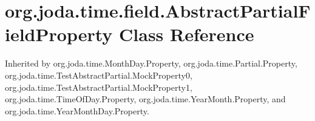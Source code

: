 \hypertarget{classorg_1_1joda_1_1time_1_1field_1_1_abstract_partial_field_property}{\section{org.\-joda.\-time.\-field.\-Abstract\-Partial\-Field\-Property Class Reference}
\label{classorg_1_1joda_1_1time_1_1field_1_1_abstract_partial_field_property}
}


Inherited by org.\-joda.\-time.\-Month\-Day.\-Property, org.\-joda.\-time.\-Partial.\-Property, org.\-joda.\-time.\-Test\-Abstract\-Partial.\-Mock\-Property0, org.\-joda.\-time.\-Test\-Abstract\-Partial.\-Mock\-Property1, org.\-joda.\-time.\-Time\-Of\-Day.\-Property, org.\-joda.\-time.\-Year\-Month.\-Property, and org.\-joda.\-time.\-Year\-Month\-Day.\-Property.

